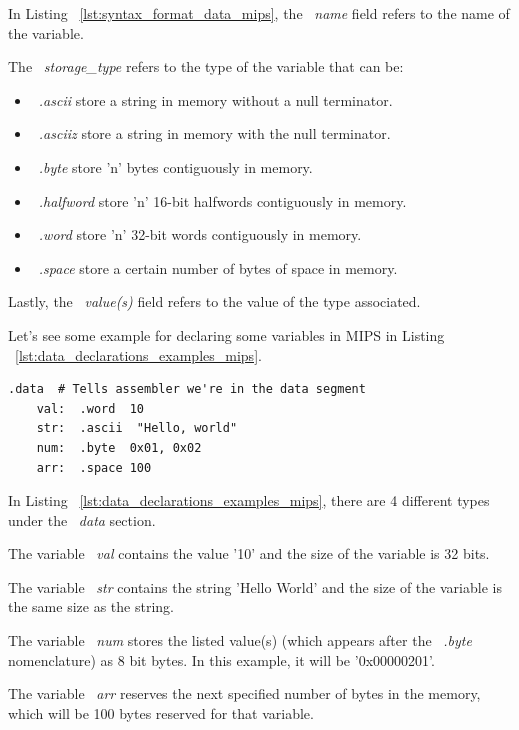 \documentclass[
  oneside,
  11pt, a4paper,
  footinclude=true,
  headinclude=true,
  cleardoublepage=empty
]{scrbook}
\begin{document}
In Listing ~\ref{lst:syntax_format_data_mips}, the ~\textit{name} field refers to the name of the variable. 

The ~\textit{storage\_type} refers to the type of the variable that can be:
\begin{itemize}
\item ~\textit{.ascii} store a string in memory without a null terminator.
\item ~\textit{.asciiz} store a string in memory with the null terminator.
\item ~\textit{.byte} store 'n' bytes contiguously in memory.
\item ~\textit{.halfword} store 'n' 16-bit halfwords contiguously in memory.
\item ~\textit{.word} store 'n' 32-bit words contiguously in memory.
\item ~\textit{.space} store a certain number of bytes of space in memory.
\end{itemize}

Lastly, the ~\textit{value(s)} field refers to the value of the type associated.

Let's see some example for declaring some variables in MIPS in Listing ~\ref{lst:data_declarations_examples_mips}.

\begin{lstlisting}[caption={Examples for declaring variables in MIPS},label={lst:data_declarations_examples_mips}]
  .data  # Tells assembler we're in the data segment
    val:  .word  10   
    str:  .ascii  "Hello, world"
    num:  .byte  0x01, 0x02
    arr:  .space 100
\end{lstlisting}

In Listing ~\ref{lst:data_declarations_examples_mips}, there are 4 different types under the ~\textit{data} section.

The variable ~\textit{val} contains the value '10' and the size of the variable is 32 bits.

The variable ~\textit{str} contains the string 'Hello World' and the size of the variable is the same size as the string.

The variable ~\textit{num} stores the listed value(s) (which appears after the ~\textit{.byte} nomenclature) as 8 bit bytes. In this example, it will be '0x00000201'.

The variable ~\textit{arr} reserves the next specified number of bytes in the memory, which will be 100 bytes reserved for that variable.
\end{document}

